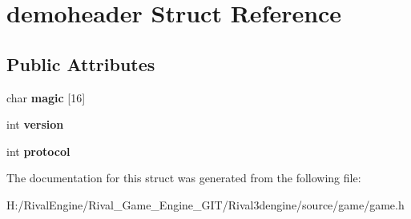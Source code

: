 \hypertarget{structdemoheader}{}\section{demoheader Struct Reference}
\label{structdemoheader}
\subsection*{Public Attributes}
\begin{DoxyCompactItemize}
\item 
\mbox{\label{structdemoheader_a390b65ab5debda390db7cb015e6823bd}} 
char {\bfseries magic} \mbox{[}16\mbox{]}
\item 
\mbox{\label{structdemoheader_aa636618deeedd026b4103572180f83d1}} 
int {\bfseries version}
\item 
\mbox{\label{structdemoheader_a3a87544261c5375044c694da542ddd80}} 
int {\bfseries protocol}
\end{DoxyCompactItemize}


The documentation for this struct was generated from the following file\+:\begin{DoxyCompactItemize}
\item 
H\+:/\+Rival\+Engine/\+Rival\+\_\+\+Game\+\_\+\+Engine\+\_\+\+G\+I\+T/\+Rival3dengine/source/game/game.\+h\end{DoxyCompactItemize}
